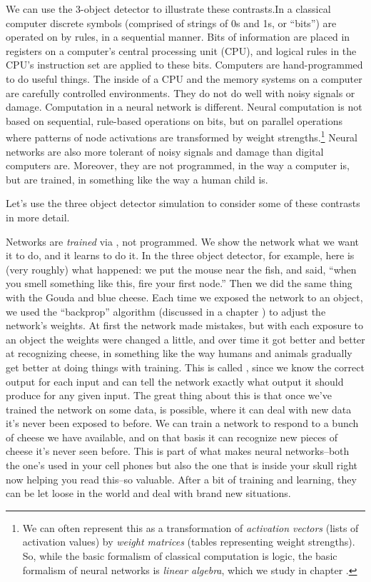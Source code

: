 We can use the 3-object detector to illustrate these contrasts.In a classical computer discrete symbols (comprised of strings of 0s and 1s, or ``bits'') are operated on by rules, in a sequential manner. Bits of information are placed in registers on a computer's central processing unit (CPU), and logical rules in the CPU's instruction set are applied to these bits. Computers are hand-programmed to do useful things. The inside of a CPU and the memory systems on a computer are carefully controlled environments. They do not do well with noisy signals or damage. Computation in a neural network is  different. Neural computation is not based on sequential, rule-based operations on bits, but on parallel operations where patterns of node activations are transformed by weight strengths.\footnote{We can often represent this as a transformation of \emph{activation vectors} (lists of activation values) by \emph{weight matrices} (tables representing weight strengths). So, while the basic formalism of classical computation is logic,  the basic formalism of neural networks is \emph{linear algebra}, which we study in chapter .}  Neural networks are also more tolerant of noisy signals and damage than digital computers are. Moreover, they are not programmed, in the way a computer is, but are trained, in something like the way a human child is.

Let's use the three object detector simulation to consider some of these contrasts in more detail. 

Networks are \emph{trained} via , not programmed. We show the network what we want it to do, and it learns to do it. In the three object detector, for example, here is (very roughly) what happened: we put the mouse near the fish, and said, ``when you smell something like this, fire your first node.''  Then we did the same thing with the Gouda and blue cheese. Each time we exposed the network to an object, we used the ``backprop'' algorithm (discussed in a chapter ) to adjust the network's weights. At first the network made mistakes, but with each exposure to an object the weights were changed a little, and over time it got better and better at recognizing cheese, in something like the way humans and animals gradually get better at doing things with training. This is called , since we know the correct output for each input and can tell the network exactly what output it should produce for any given input.  The great thing about this is that once we've trained the network on some data,  is possible, where it can deal with new data it's never been exposed to before. We can train a network to respond to a bunch of cheese we have available, and on that basis it can recognize new pieces of cheese it's never seen before. This is part of what makes neural networks--both the one's used in your cell phones but also the one that is inside your skull right now helping you read this--so valuable. After a bit of training and learning, they can be let loose in the world and deal with brand new situations.

